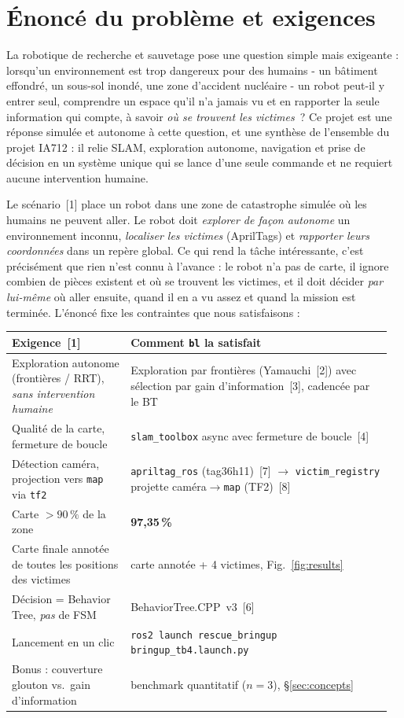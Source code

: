 \documentclass[11pt,a4paper]{article}
\begin{document}
\section{Énoncé du problème et exigences}
La robotique de recherche et sauvetage pose une question simple mais exigeante : lorsqu'un
environnement est trop dangereux pour des humains - un bâtiment effondré, un sous-sol inondé, une zone
d'accident nucléaire - un robot peut-il y entrer seul, comprendre un espace qu'il n'a jamais vu et en
rapporter la seule information qui compte, à savoir \emph{où se trouvent les victimes}~? Ce projet est
une réponse simulée et autonome à cette question, et une synthèse de l'ensemble du projet IA712 : il
relie SLAM, exploration autonome, navigation et prise de décision en un système unique qui se lance
d'une seule commande et ne requiert aucune intervention humaine.

Le scénario~[1] place un robot dans une zone de catastrophe simulée où les humains ne peuvent aller.
Le robot doit \emph{explorer de façon autonome} un environnement inconnu, \emph{localiser les victimes}
(AprilTags) et \emph{rapporter leurs coordonnées} dans un repère global. Ce qui rend la tâche
intéressante, c'est précisément que rien n'est connu à l'avance : le robot n'a pas de carte, il ignore
combien de pièces existent et où se trouvent les victimes, et il doit décider \emph{par lui-même} où
aller ensuite, quand il en a vu assez et quand la mission est terminée. L'énoncé fixe les contraintes
que nous satisfaisons :

\smallskip
{\footnotesize
\begin{tabular}{@{}p{0.30\linewidth}p{0.66\linewidth}@{}}
\toprule
\textbf{Exigence~[1]} & \textbf{Comment \texttt{bl} la satisfait}\\
\midrule
Exploration autonome (frontières / RRT), \emph{sans intervention humaine} & Exploration par frontières (Yamauchi~[2]) avec sélection par gain d'information~[3], cadencée par le BT\\
Qualité de la carte, fermeture de boucle & \texttt{slam\_toolbox} async avec fermeture de boucle~[4]\\
Détection caméra, projection vers \texttt{map} via \texttt{tf2} & \texttt{apriltag\_ros} (tag36h11)~[7] $\to$ \texttt{victim\_registry} projette caméra$\to$\texttt{map} (TF2)~[8]\\
Carte $>90\,\%$ de la zone & \textbf{97,35\,\%}\\
Carte finale annotée de toutes les positions des victimes & carte annotée + 4 victimes, Fig.~\ref{fig:results}\\
Décision = Behavior Tree, \emph{pas} de FSM & BehaviorTree.CPP~v3~[6]\\
Lancement en un clic & \texttt{ros2 launch rescue\_bringup bringup\_tb4.launch.py}\\
Bonus : couverture glouton vs.\ gain d'information & benchmark quantitatif ($n{=}3$), \S\ref{sec:concepts}\\
\bottomrule
\end{tabular}}
\end{document}
